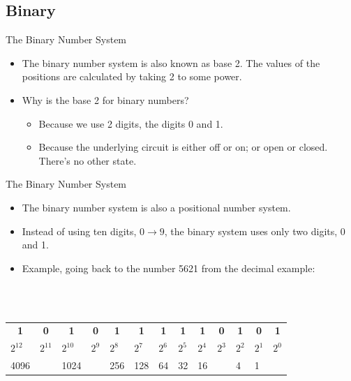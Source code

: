 \documentclass[graphics]{beamer}
\newcommand*{\thead}[1]{\multicolumn{1}{c}{\bfseries #1}}
\begin{document}
\subsection{Binary}
\begin{frame}{The Binary Number System}
    \begin{itemize}
        \item The binary number system is also known as base 2. The values of the positions are calculated by taking 2 to some power.
        \item Why is the base 2 for binary numbers?
        \begin{itemize}
            \item Because we use 2 digits, the digits 0 and 1.
            \item Because the underlying circuit is either off or on; or open or closed. There's no other state.
        \end{itemize}
    \end{itemize}
\end{frame}

\begin{frame}{The Binary Number System}
    \begin{itemize}
        \item The binary number system is also a positional number system.
        \item Instead of using ten digits, $0\rightarrow9$, the binary system uses only two digits, 0 and 1.
        \item Example, going back to the number 5621 from the decimal example:
    \end{itemize}
    \\ ~~ \\
    \begin{tabular}{ l l l l l l l l l l l l l }
        \thead{1} & \thead{0} & \thead{1} & \thead{0} & \thead{1} & \thead{1} & \thead{1} & \thead{1} & \thead{1} & \thead{0} & \thead{1} & \thead{0} & \thead{1} \\
        $2^{12}$ & $2^{11}$ & $2^{10}$ & $2^9$ & $2^8$ & $2^7$ & $2^6$ & $2^5$ & $2^4$ & $2^3$ & $2^2$ & $2^1$ & $2^0$ \\
        4096 & & 1024 & & 256 & 128 & 64 & 32 & 16 & & 4 & 1
    \end{tabular}
\end{frame}
\end{document}
